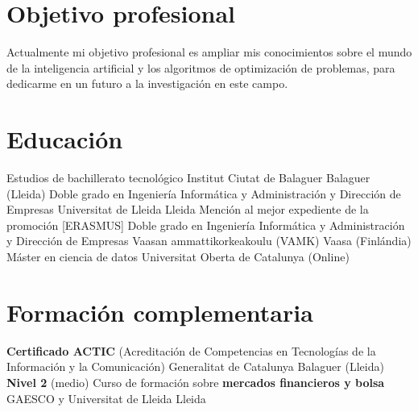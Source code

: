 \documentclass[a4paper,12pt,final]{moderncv}
\begin{document}
\makecvtitle

\section{Objetivo profesional}
Actualmente mi objetivo profesional es ampliar mis conocimientos
sobre el mundo de la inteligencia artificial y los algoritmos de optimización
de problemas, para dedicarme en un futuro a la investigación en este campo.

\section{Educación}
	{Estudios de bachillerato tecnológico}
	{Institut Ciutat de Balaguer}
	{Balaguer (Lleida)}
	{}
	{}
	{Doble grado en Ingeniería Informática y Administración y Dirección de Empresas}
	{Universitat de Lleida}
	{Lleida}
	{Mención al mejor expediente de la promoción}
	{}
	{[ERASMUS] Doble grado en Ingeniería Informática y Administración y Dirección de Empresas}
	{Vaasan ammattikorkeakoulu (VAMK)}
	{Vaasa (Finlándia)}
	{}
	{}
	{Máster en ciencia de datos}
	{Universitat Oberta de Catalunya}
	{(Online)}
	{}
	{}

\section{Formación complementaria}
	{\textbf{Certificado ACTIC} (Acreditación de Competencias en Tecnologías de
		la Información y la Comunicación)}
	{Generalitat de Catalunya}
	{Balaguer (Lleida)}
	{\textbf{Nivel 2} (medio)}
	{}
	{Curso de formación sobre \textbf{mercados financieros y bolsa}}
	{GAESCO y Universitat de Lleida}
	{Lleida}
	{}
	{}
	{}
\end{document}
